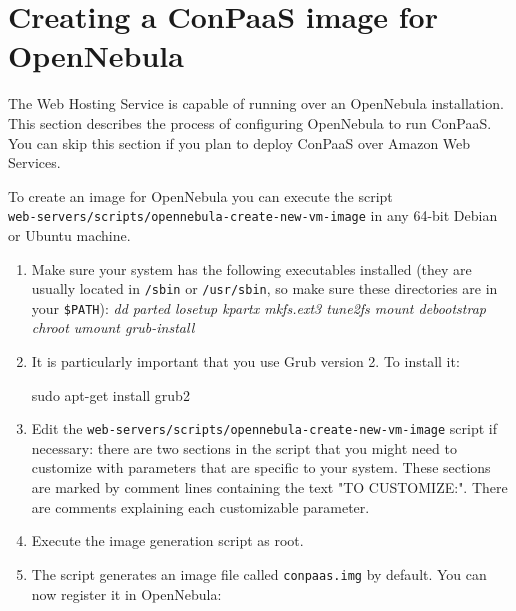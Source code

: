 \documentclass[10pt]{article}
\begin{document}
\section{Creating a ConPaaS image for OpenNebula}

The Web Hosting Service is capable of running over an OpenNebula
installation. This section describes the process of configuring
OpenNebula to run ConPaaS. You can skip this section if you plan to
deploy ConPaaS over Amazon Web Services.

To create an image for OpenNebula you can execute the script\\
\verb+web-servers/scripts/opennebula-create-new-vm-image+ in any
64-bit Debian or Ubuntu machine.

\begin{enumerate}
\item Make sure your system has the following executables installed
  (they are usually located in \verb+/sbin+ or \verb+/usr/sbin+, so
  make sure these directories are in your \verb+$PATH+): %
  \emph{dd parted losetup kpartx mkfs.ext3 tune2fs mount debootstrap
    chroot umount grub-install}
\item It is particularly important that you use Grub version 2. To
  install it:
  \begin{code}
  sudo apt-get install grub2
  \end{code}
\item Edit the
  \verb+web-servers/scripts/opennebula-create-new-vm-image+ script
  if necessary: there are two sections in the script that you might need
  to customize with parameters that are specific to your system. These
  sections are marked by comment lines containing the text "TO CUSTOMIZE:".
  There are comments explaining each customizable parameter. 
\item Execute the image generation script as root.
\item The script generates an image file called \verb+conpaas.img+
  by default. You can now register it in OpenNebula:

\vspace{10 mm}

\end{enumerate}
\end{document}
